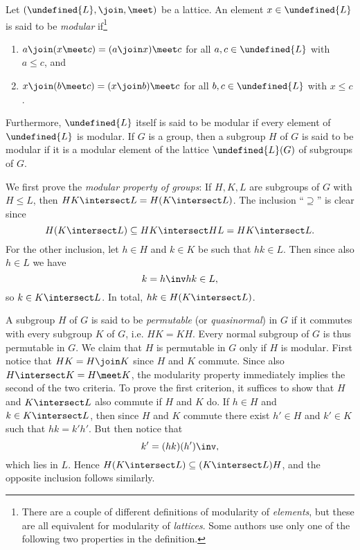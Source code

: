 \documentclass[article, a4paper, 11pt, oneside]{memoir}
\let\mathfrak\undefined
\numberwithin{equation}{chapter}
\newcommand{\frakL}{\mathfrak{L}}
\theoremstyle{nonumberplain}
\begin{document}
\begin{remarkbreak}
    Let $(\frakL,\join,\meet)$ be a lattice. An element $x \in \frakL$ is said to be \emph{modular} if\footnote{There are a couple of different definitions of modularity of \emph{elements}, but these are all equivalent for modularity of \emph{lattices}. Some authors use only one of the following two properties in the definition.}
    \begin{enumerate}[label=(\arabic*)]
        \item $a \join (x \meet c) = (a \join x) \meet c$ for all $a,c \in \frakL$ with $a \leq c$, and

        \item $x \join (b \meet c) = (x \join b) \meet c$ for all $b,c \in \frakL$ with $x \leq c$.
    \end{enumerate}
    Furthermore, $\frakL$ itself is said to be modular if every element of $\frakL$ is modular. If $G$ is a group, then a subgroup $H$ of $G$ is said to be modular if it is a modular element of the lattice $\mathfrak{L}(G)$ of subgroups of $G$.

    We first prove the \emph{modular property of groups}: If $H,K,L$ are subgroups of $G$ with $H \leq L$, then $HK \intersect L = H (K \intersect L)$. The inclusion \enquote{$\supseteq$} is clear since
    \begin{equation*}
        H (K \intersect L)
            \subseteq HK \intersect HL
            = HK \intersect L.
    \end{equation*}
    For the other inclusion, let $h \in H$ and $k \in K$ be such that $hk \in L$. Then since also $h \in L$ we have
    \begin{equation*}
        k
            = h\inv hk
            \in L,
    \end{equation*}
    so $k \in K \intersect L$. In total, $hk \in H(K \intersect L)$.

    A subgroup $H$ of $G$ is said to be \emph{permutable} (or \emph{quasinormal}) in $G$ if it commutes with every subgroup $K$ of $G$, i.e. $HK = KH$. Every normal subgroup of $G$ is thus permutable in $G$. We claim that $H$ is permutable in $G$ only if $H$ is modular. First notice that $HK = H \join K$ since $H$ and $K$ commute. Since also $H \intersect K = H \meet K$, the modularity property immediately implies the second of the two criteria. To prove the first criterion, it suffices to show that $H$ and $K \intersect L$ also commute if $H$ and $K$ do. If $h \in H$ and $k \in K \intersect L$, then since $H$ and $K$ commute there exist $h' \in H$ and $k' \in K$ such that $hk = k'h'$. But then notice that
    \begin{equation*}
        k'
            = (hk)(h')\inv,
    \end{equation*}
    which lies in $L$. Hence $H(K \intersect L) \subseteq (K \intersect L)H$, and the opposite inclusion follows similarly.


\end{remarkbreak}
\end{document}
